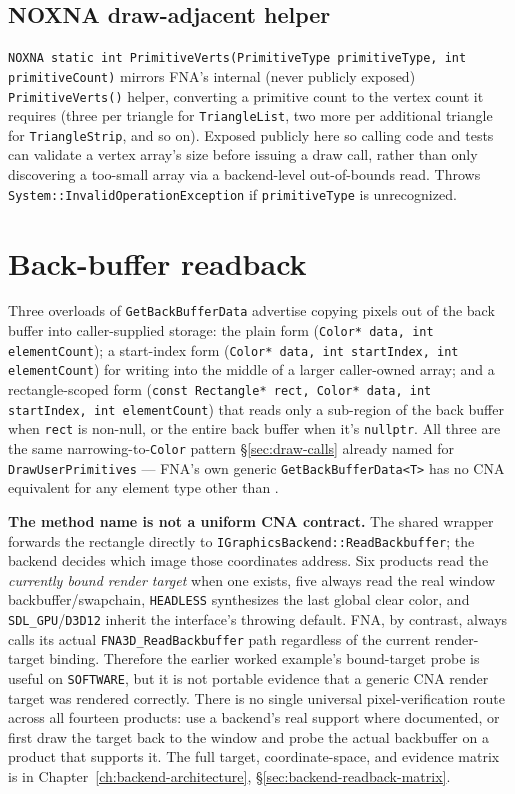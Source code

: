 \subsection{NOXNA draw-adjacent helper}

\texttt{NOXNA static int PrimitiveVerts(PrimitiveType primitiveType, int primitiveCount)}
mirrors FNA's internal (never publicly exposed) \texttt{PrimitiveVerts()} helper, converting a
primitive count to the vertex count it requires (three per triangle for
\texttt{TriangleList}, two more per additional triangle for \texttt{TriangleStrip}, and so on).
Exposed publicly here so calling code and tests can validate a vertex array's size before
issuing a draw call, rather than only discovering a too-small array via a backend-level
out-of-bounds read. Throws \texttt{System::InvalidOperationException} if \texttt{primitiveType}
is unrecognized.

\section{Back-buffer readback}
\label{sec:backbuffer-readback}

Three overloads of \texttt{GetBackBufferData} advertise copying pixels out of the back buffer
into caller-supplied  storage: the plain form
(\texttt{Color* data, int elementCount}); a start-index form
(\texttt{Color* data, int startIndex, int elementCount}) for writing into the middle of a
larger caller-owned array; and a rectangle-scoped form
(\texttt{const Rectangle* rect, Color* data, int startIndex, int elementCount}) that reads only
a sub-region of the back buffer when \texttt{rect} is non-null, or the entire back buffer when
it's \texttt{nullptr}. All three are the same narrowing-to-\texttt{Color} pattern
\S\ref{sec:draw-calls} already named for \texttt{DrawUserPrimitives} --- FNA's own generic
\texttt{GetBackBufferData<T>} has no CNA equivalent for any element type other than
.

\textbf{The method name is not a uniform CNA contract.} The shared wrapper forwards the
rectangle directly to \texttt{IGraphicsBackend::ReadBackbuffer}; the backend decides which
image those coordinates address. Six products read the \emph{currently bound render target}
when one exists, five always read the real window backbuffer/swapchain, \texttt{HEADLESS}
synthesizes the last global clear color, and \texttt{SDL\_GPU}/\texttt{D3D12} inherit the
interface's throwing default. FNA, by contrast, always calls its actual
\texttt{FNA3D\_ReadBackbuffer} path regardless of the current render-target binding. Therefore
the earlier worked example's bound-target probe is useful on \texttt{SOFTWARE}, but it is not
portable evidence that a generic CNA render target was rendered correctly. There is no single
universal pixel-verification route across all fourteen products: use a backend's real
 support where documented, or first draw the target back to
the window and probe the actual backbuffer on a product that supports it. The full target,
coordinate-space, and evidence matrix is in
Chapter~\ref{ch:backend-architecture}, \S\ref{sec:backend-readback-matrix}.

